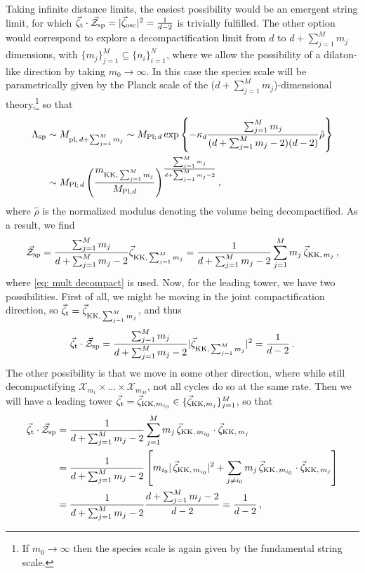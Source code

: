 Taking infinite distance limits, the easiest possibility would be an emergent string limit, for which $\vec{\zeta}_{\text{t}}\cdot\vec{\mathcal{Z}}_{\rm sp}=|\vec{\zeta}_{\rm osc}|^2=\frac{1}{d-2}$ is trivially fulfilled. The other option would correspond to explore a decompactification limit from $d$ to $d+\sum_{j=1}^M m_j$ dimensions, with $\{m_j\}_{j=1}^M\subseteq\{n_i\}_{i=1}^N$, where we allow the possibility of a dilaton-like direction by taking $m_0\to\infty$. In this case the species scale will be parametrically given by the Planck scale of the ($d+\sum_{j=1}^M m_j$)-dimensional theory,\footnote{If $m_0\to\infty$ then the species scale is again given by the fundamental string scale.} so that
%
\begin{align} \label{eq:kkspeciesvectorgeneral}
	\Lambda_{\text{sp}}&\sim M_{{\rm pl},\, d+\sum_{j=1}^M m_j}\sim M_{\text{Pl};\, d}\exp\left\{-\kappa_d\frac{\sum_{j=1}^M m_j}{(d+\sum_{j=1}^M m_j-2)(d-2)}\hat{\rho}\right\}\notag\\
	&\sim M_{\text{Pl};\, d}\left(\frac{m_{{\rm KK},\, \sum_{j=1}^M m_j}}{M_{{\rm Pl},d}}\right)^{\frac{\sum_{j=1}^M m_j}{d+\sum_{j=1}^M m_j-2}},
\end{align}
%
where $\hat{\rho}$ is the normalized modulus denoting the volume being decompactified. As a result, we find
%
\begin{equation}
	\vec{\mathcal{Z}}_{\rm sp}=\frac{\sum_{j=1}^M m_j}{d+\sum_{j=1}^M m_j-2}\vec{\zeta}_{{\rm KK},\, \sum_{j=1}^M m_j}=\frac{1}{d+\sum_{j=1}^M m_j-2}\sum_{j=1}^M m_j\, \vec{\zeta}_{{\rm KK},\, m_j}\, ,
\end{equation}
%
where \eqref{eq: mult decompact} is used. Now, for the leading tower, we have two possibilities. First of all, we might be moving in the joint compactification direction, so $\vec{\zeta}_{\text{t}}=\vec{\zeta}_{{\rm KK},\, \sum_{j=1}^M m_j}$, and thus
%
\begin{equation}
	\vec{\zeta}_{\text{t}}\cdot\vec{\mathcal{Z}}_{\rm sp}=\frac{\sum_{j=1}^M m_j}{d+\sum_{j=1}^M m_j-2} |\vec{\zeta}_{{\rm KK},\, \sum_{j=1}^M m_j}|^2=\frac{1}{d-2}\, .
\end{equation}
%
The other possibility is that we move in some other direction, where while still decompactifying  $\mathcal{X}_{m_1}\times \ldots \times \mathcal{X}_{m_M}$, not all cycles do so at the same rate. Then we will have a leading tower $\vec{\zeta}_{\text{t}}=\vec{\zeta}_{{\rm KK},{m_{i_0}}}\in \{\vec{\zeta}_{{\rm KK},m_j}\}_{j=1}^M$, so that
%
\begin{align}
	\vec{\zeta}_{\text{t}}\cdot\vec{\mathcal{Z}}_{\rm sp}&= \frac{1}{d+\sum_{j=1}^M m_j-2}\sum_{j=1}^M m_j\, \vec{\zeta}_{{\rm KK},\, {m_{i_0}}}\cdot\vec{\zeta}_{{\rm KK},\, m_j}\notag\\
	&=\frac{1}{d+\sum_{j=1}^M m_j-2}\left[m_{i_0}|\, \vec{\zeta}_{{\rm KK},\,{m_{i_0}}}|^2+\sum_{j\neq i_0}m_j\, \vec{\zeta}_{{\rm KK},\,{m_{i_0}}}\cdot\vec{\zeta}_{{\rm KK},\, m_j}\right]\notag\\
	&=\frac{1}{d+\sum_{j=1}^M m_j-2}\frac{d+\sum_{j=1}^Mm_{j}-2}{d-2}=\frac{1}{d-2}\, ,
\end{align}
